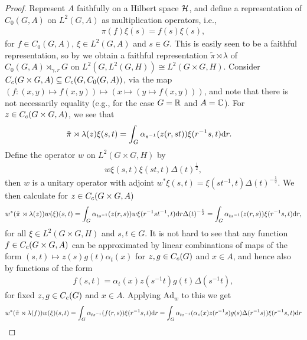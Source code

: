 \begin{proof}
 Represent $A$ faithfully on a Hilbert space $\mathcal{H}$, and define a representation of $C_0(G,A)$ on $L^2(G,A)$ as multiplication operators, i.e.,
\begin{align*}
	\pi(f) \xi (s) = f(s)\xi(s), 
\end{align*}
for $f \in C_0(G,A)$, $\xi \in L^2(G,A)$ and $s \in G$. This is easily seen to be a faithful representation, so by  we obtain a faithful representation $\tilde \pi \rtimes \lambda$ of $C_0(G,A) \rtimes_{\gamma,r} G$ on $L^2(G,L^2(G,H)) \cong L^2(G \times G, H)$. Consider $C_c(G \times G,A) \subseteq C_c(G,C_0(G,A))$, via the map $(f \colon (x,y) \mapsto f(x,y)) \mapsto (x \mapsto (y \mapsto f(x,y)))$, and note that there is not necessarily equality (e.g., for the case $G=  \mathbb{R}$ and $A = \mathbb{C}$). For $z \in C_c(G \times G, A)$, we see that
\begin{align*}
	\tilde \pi \rtimes \lambda (z) \xi(s,t) &= \int_G \alpha_{s^{-1}}(z(r,st)) \xi(r^{-1}s,t) \mathrm{d} r.
\end{align*}
Define the operator $w$ on $L^2(G\times G,H)$ by
\begin{align*}
	w \xi(s,t) \xi(st,t) \Delta(t)^{\frac12},
\end{align*}
then $w$ is a unitary operator with adjoint $w^* \xi(s,t) = \xi(st^{-1},t) \Delta(t)^{-\frac12}$. We then calculate for $z \in C_c(G \times G, A)$
\begin{align*}
	w^*  (\tilde \pi \rtimes \lambda (z)) w (\xi) (s,t) = \int_G \alpha_{ts^{-1}} (z(r,s)) w \xi(r^{-1} s t^{-1},t) \mathrm{d} r \Delta(t)^{-\frac12} = \int_G \alpha_{ts^{-1}}(z(r,s)) \xi(r^{-1}s,t) \mathrm{d} r,
\end{align*}
for all $\xi \in L^2(G \times G, H)$ and $s,t \in G$. It is not hard to see that any function $f \in C_c(G \times G , A)$ can be approximated by linear combinations of maps of the form $(s,t) \mapsto z(s)g(t)\alpha_t(x)$ for $z,g \in C_c(G)$ and $x \in A$, and hence also by functions of the form
\begin{align*}
	f(s,t) = \alpha_{t}(x) z(s^{-1}t)g(t) \Delta(s^{-1}t),
\end{align*}
for fixed $z,g \in C_c(G)$ and $x \in A$. Applying $\mathrm{Ad}_{w}$ to this we get
\begin{align*}
	w^* (\tilde \pi \rtimes \lambda(f)) w(\xi)(s,t) = \int_G \alpha_{ts^{-1}}(f(r,s)) \xi(r^{-1}s,t) \d r &= \int_G \alpha_{ts^{-1}}(\alpha_s(x) z(r^{-1}s)g(s) \Delta(r^{-1}s)) \xi(r^{-1}s,t) \d r \\

\end{align*}
\end{proof}
